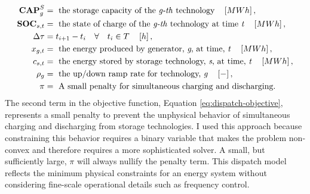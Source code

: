 \begin{align}
    \textbf{CAP}^S_g &= \text{ the storage capacity of the \textit{g-th} technology}\quad \left[MWh\right],\nonumber\\
    \textbf{SOC}_{s,t} &= \text{ the state of charge of the \textit{g-th} technology at time \textit{t}}\quad \left[MWh\right]\nonumber,\\
    \Delta\tau &= t_{i+1} - t_i \quad \forall \quad t_i \in T \quad \left[h\right],\nonumber\\
    x_{g,t} &= \text{ the energy produced by generator, \textit{g}, at time, \textit{t}}\quad \left[MWh\right]\nonumber,\\
    c_{s,t} &= \text{ the energy stored by storage technology, \textit{s}, at time, \textit{t}}\quad \left[MWh\right]\nonumber,\\
    \rho_g &= \text{ the up/down ramp rate for technology, \textit{g}} \quad \left[-\right]\nonumber,\\
    \pi &= \text{ A small penalty for simultaneous charging and discharging.}\nonumber
\end{align}
The second term in the objective function, Equation \ref{eq:dispatch-objective}, represents
a small penalty to prevent the unphysical behavior of simultaneous charging and discharging
from storage technologies. I used this approach because constraining this behavior requires a
binary variable that makes the problem non-convex and therefore requires a more sophisticated solver. A small, but sufficiently large, $\pi$ will always nullify the penalty term. This dispatch model reflects the minimum physical constraints for an energy system without considering fine-scale operational details such as frequency control.